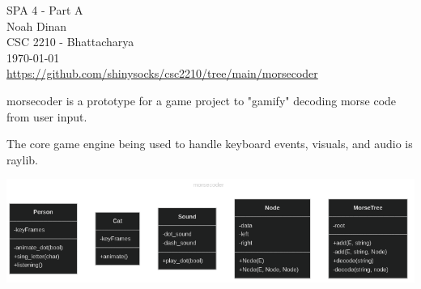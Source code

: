 \documentclass[12pt]{article}
\begin{document}
\setlength{\parindent}{0in}
SPA 4 - Part A \\ Noah Dinan \\ CSC 2210 - Bhattacharya \\ \today \\
\url{https://github.com/shinysocks/csc2210/tree/main/morsecoder}

\vspace{0.5in}


morsecoder is a prototype for a game project to "gamify" decoding morse code from user input.

The core game engine being used to handle keyboard events, visuals, and audio is raylib.

\begin{center}
    \includegraphics[scale=0.6]{o-1.png}
\end{center}
\end{document}

